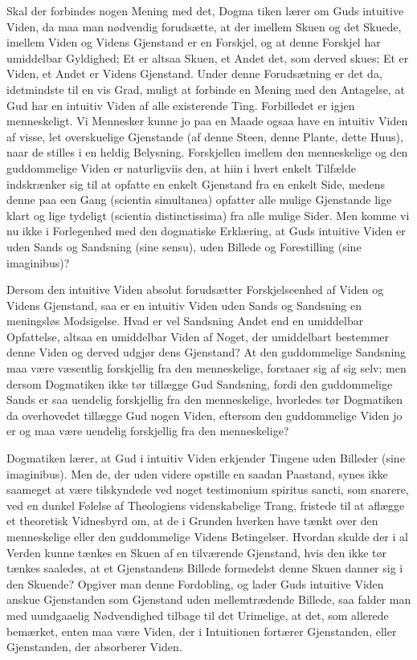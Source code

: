 \documentclass[12pt]{book}
\newcommand{\opage}[1]{\marginnote{\footnotesize\textit{[#1]}}}
\begin{document}
Skal der forbindes nogen Mening med det, Dogma%
\opage{238} tiken lærer om Guds intuitive Viden, da maa man nødvendig forudsætte, at der imellem Skuen og det
Skuede, imellem Viden og Videns Gjenstand er en Forskjel, og at denne Forskjel har umiddelbar
Gyldighed; Et er altsaa Skuen, et Andet det, som derved skues; Et er Viden, et Andet er Videns
Gjenstand. Under denne Forudsætning er det da, idetmindste til en vis Grad, muligt at forbinde en
Mening med den Antagelse, at Gud har en intuitiv Viden af alle existerende Ting. Forbilledet er
igjen menneskeligt. Vi Mennesker kunne jo paa en Maade ogsaa have en intuitiv Viden af visse, let
overskuelige Gjenstande (af denne Steen, denne Plante, dette Huus), naar de stilles i en heldig
Belysning. Forskjellen imellem den menneskelige og den guddommelige Viden er naturligviis den, at
hiin i hvert enkelt Tilfælde indskrænker sig til at opfatte en enkelt Gjenstand fra en enkelt Side,
medens denne paa een Gang (scientia simultanea) opfatter alle mulige Gjenstande lige klart og lige
tydeligt (scientia distinctissima) fra alle mulige Sider. Men komme vi nu ikke i Forlegenhed med
den dogmatiske Erklæring, at Guds intuitive Viden er uden Sands og Sandsning (sine sensu), uden
Billede og Forestilling (sine imaginibus)?

Dersom den intuitive Viden absolut forudsætter Forskjelseenhed af Viden og Videns Gjenstand, saa er
en intuitiv Viden uden Sands og Sandsning en meningsløs Modsigelse. Hvad er vel Sandsning Andet end
en umiddelbar Opfattelse, altsaa en umiddelbar Viden af Noget, der umiddelbart bestemmer denne
Viden og derved udgjør dens Gjenstand? At den guddommelige Sandsning maa være væsentlig forskjellig
fra den menneskelige, forstaaer sig af sig selv; men dersom Dogmatiken ikke tør tillægge Gud
Sandsning, fordi den guddommelige Sands er saa uendelig forskjellig fra den menneskelige, hvorledes
tør Dogmatiken da overhovedet tillægge Gud
\opage{239} nogen Viden, eftersom den guddommelige Viden jo er og maa være uendelig forskjellig fra den
menneskelige?

Dogmatiken lærer, at Gud i intuitiv Viden erkjender Tingene uden Billeder (sine imaginibus). Men
de, der uden videre opstille en saadan Paastand, synes ikke saameget at være tilskyndede ved noget
testimonium spiritus sancti, som snarere, ved en dunkel Følelse af Theologiens videnskabelige
Trang, fristede til at aflægge et theoretisk Vidnesbyrd om, at de i Grunden hverken have tænkt over
den menneskelige eller den guddommelige Videns Betingelser. Hvordan skulde der i al Verden kunne
tænkes en Skuen af en tilværende Gjenstand, hvis den ikke tør tænkes saaledes, at et Gjenstandens
Billede formedelst denne Skuen danner sig i den Skuende? Opgiver man denne Fordobling, og lader Guds
intuitive Viden anskue Gjenstanden som Gjenstand uden mellemtrædende Billede, saa falder man med
uundgaaelig Nødvendighed tilbage til det Urimelige, at det, som allerede bemærket, enten maa være
Viden, der i Intuitionen fortærer Gjenstanden, eller Gjenstanden, der absorberer Viden.
\end{document}

